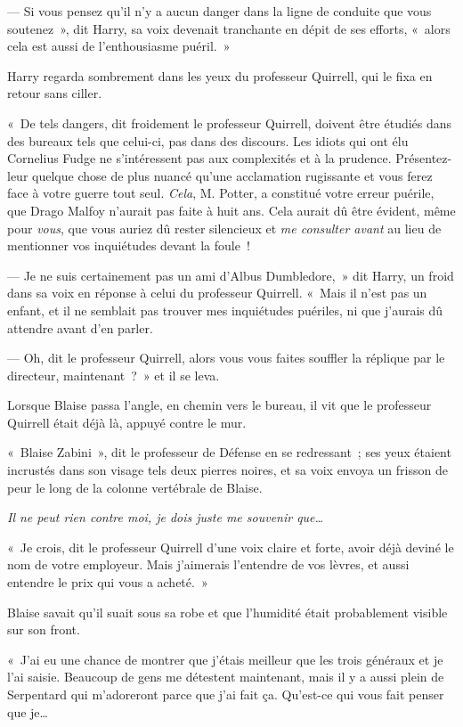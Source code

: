 --- Si vous pensez qu'il n'y a aucun danger dans la ligne de conduite que vous soutenez~», dit Harry, sa voix devenait tranchante en dépit de ses efforts, «~alors cela est aussi de l'enthousiasme puéril.~»

Harry regarda sombrement dans les yeux du professeur Quirrell, qui le fixa en retour sans ciller.

«~De tels dangers, dit froidement le professeur Quirrell, doivent être étudiés dans des bureaux tels que celui-ci, pas dans des discours. Les idiots qui ont élu Cornelius Fudge ne s'intéressent pas aux complexités et à la prudence. Présentez-leur quelque chose de plus nuancé qu'une acclamation rugissante et vous ferez face à votre guerre tout seul. \emph{Cela}, M. Potter, a constitué votre erreur puérile, que Drago Malfoy n'aurait pas faite à huit ans. Cela aurait dû être évident, même pour \emph{vous}, que vous auriez dû rester silencieux et \emph{me consulter avant} au lieu de mentionner vos inquiétudes devant la foule~!

--- Je ne suis certainement pas un ami d'Albus Dumbledore,~» dit Harry, un froid dans sa voix en réponse à celui du professeur Quirrell. «~Mais il n'est pas un enfant, et il ne semblait pas trouver mes inquiétudes puériles, ni que j'aurais dû attendre avant d'en parler.

--- Oh, dit le professeur Quirrell, alors vous vous faites souffler la réplique par le directeur, maintenant~?~» et il se leva.

\later

Lorsque Blaise passa l'angle, en chemin vers le bureau, il vit que le professeur Quirrell était déjà là, appuyé contre le mur.

«~Blaise Zabini~», dit le professeur de Défense en se redressant~; ses yeux étaient incrustés dans son visage tels deux pierres noires, et sa voix envoya un frisson de peur le long de la colonne vertébrale de Blaise.

\emph{Il ne peut rien contre moi, je dois juste me souvenir que…}

«~Je crois, dit le professeur Quirrell d'une voix claire et forte, avoir déjà deviné le nom de votre employeur. Mais j'aimerais l'entendre de vos lèvres, et aussi entendre le prix qui vous a acheté.~»

Blaise savait qu'il suait sous sa robe et que l'humidité était probablement visible sur son front.

«~J'ai eu une chance de montrer que j'étais meilleur que les trois généraux et je l'ai saisie. Beaucoup de gens me détestent maintenant, mais il y a aussi plein de Serpentard qui m'adoreront parce que j'ai fait ça. Qu'est-ce qui vous fait penser que je…

